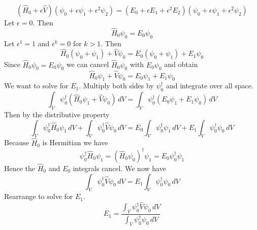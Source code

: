 \documentclass[12pt]{article}
\begin{document}
\noindent
$$
\left(\hat{H}_0+\epsilon\hat{V}\right)
\left(\psi_0+\epsilon\psi_1+\epsilon^2\psi_2\right)
=
\left(E_0+\epsilon E_1+\epsilon^2 E_2\right)
\left(\psi_0+\epsilon\psi_1+\epsilon^2\psi_2\right)
$$
Let $\epsilon=0$. Then
$$\hat{H}_0\psi_0=E_0\psi_0
$$
Let $\epsilon^1=1$ and $\epsilon^k=0$ for $k>1$. Then
$$
\hat{H}_0(\psi_0+\psi_1)+\hat{V}\psi_0
=
E_0(\psi_0+\psi_1)+E_1\psi_0
$$
Since $\hat{H}_0\psi_0=E_0\psi_0$ we can cancel $\hat{H}_0\psi_0$ with $E_0\psi_0$
and obtain
$$
\hat{H}_0\psi_1+\hat{V}\psi_0
=
E_0\psi_1+E_1\psi_0
$$
We want to solve for $E_1$.
Multiply both sides by $\psi_0^\dag$ and integrate over all space.
$$
\int_V\psi_0^\dag\left(\hat{H}_0\psi_1+\hat{V}\psi_0\right)\,dV
=
\int_V\psi_0^\dag\left(E_0\psi_1+E_1\psi_0\right)\,dV
$$
Then by the distributive property
$$
\int_V\psi_0^\dag\hat{H}_0\psi_1\,dV
+
\int_V\psi_0^\dag\hat{V}\psi_0\,dV
=
E_0\int_V\psi_0^\dag\psi_1\,dV
+
E_1\int_V\psi_0^\dag\psi_0\,dV
$$
Because $\hat{H}_0$ is Hermitian we have
$$
\psi_0^\dag\hat{H}_0\psi_1=(\hat{H}_0\psi_0)^\dag\psi_1=E_0\psi_0^\dag\psi_1
$$
Hence the $\hat{H}_0$ and $E_0$ integrals cancel.
We now have
$$
\int_V\psi_0^\dag\hat{V}\psi_0\,dV
=
E_1\int_V\psi_0^\dag\psi_0\,dV
$$
Rearrange to solve for $E_1$.
$$
E_1=\frac{\int_V\psi_0^\dag\hat{V}\psi_0\,dV}{\int_V\psi_0^\dag\psi_0\,dV}
$$

\end{document}
